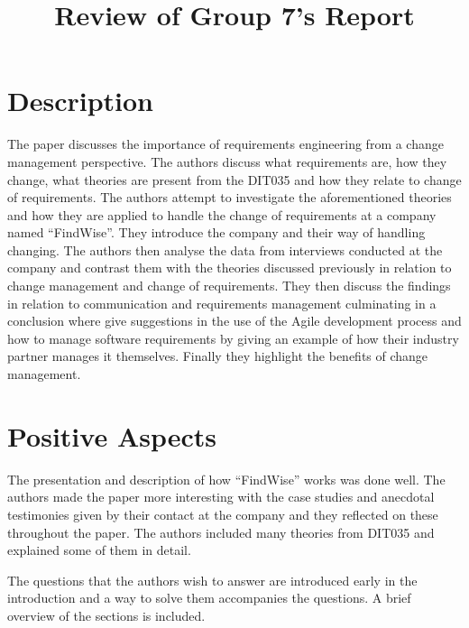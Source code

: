 \documentclass[conference]{IEEEtran}
\begin{document}
%
\title{Review of Group 7's Report}

\author{

}

\maketitle

\section{Description}
The paper discusses the importance of requirements engineering from a change management perspective. The authors discuss what requirements are, how they change, what theories are present from the DIT035 and how they relate to change of requirements. The authors attempt to investigate the aforementioned theories and how they are applied to handle the change of requirements at a company named ``FindWise''. They introduce the company and their way of handling changing. The authors then analyse the data from interviews conducted at the company and contrast them with the theories discussed previously in relation to change management and change of requirements. They then discuss the findings in relation to communication and requirements management culminating in a conclusion where give suggestions in the use of the Agile development process and how to manage software requirements by giving an example of how their industry partner manages it themselves. Finally they highlight the benefits of change management. 
\section{Positive Aspects}
The presentation and description of how ``FindWise'' works was done well. The authors made the paper more interesting with the case studies and anecdotal testimonies given by their contact at the company and they reflected on these throughout the paper. The authors included many theories from DIT035 and explained some of them in detail.

The questions that the authors wish to answer are introduced early in the introduction and a way to solve them accompanies the questions. A brief overview of the sections is included. 
\end{document}
